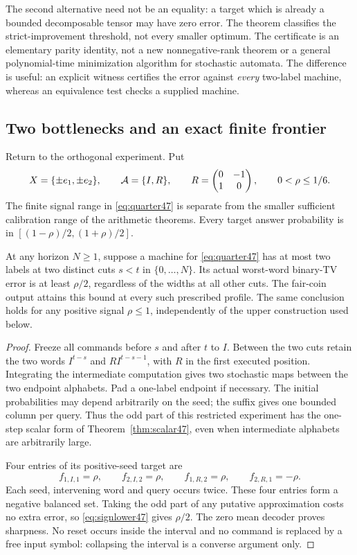The second alternative need not be an equality: a target which is
already a bounded decomposable tensor may have zero error. The theorem
classifies the strict-improvement threshold, not every smaller optimum.
The certificate is an elementary parity identity, not a new
nonnegative-rank theorem or a general polynomial-time minimization
algorithm for stochastic automata. The difference is useful: an
explicit witness certifies the error against \emph{every} two-label
machine, whereas an equivalence test checks a supplied machine.

\subsection{Two bottlenecks and an exact finite frontier}
Return to the orthogonal experiment. Put
\begin{equation}\label{eq:quarter47}
 X=\{\pm e_1,\pm e_2\},\qquad
 \mathcal A=\{I,R\},\qquad
 R=\begin{pmatrix}0&-1\\1&0\end{pmatrix},
 \qquad0<\rho\le1/6.
\end{equation}
The finite signal range in \eqref{eq:quarter47} is separate from the
smaller sufficient calibration range of the arithmetic theorems.
Every target answer probability is in $[(1-\rho)/2,(1+\rho)/2]$.

\begin{theorem}\label{thm:bottleneck47}
At any horizon $N\ge1$, suppose a machine for \eqref{eq:quarter47}
has at most two labels at two distinct cuts $s<t$ in $\{0,\ldots,N\}$.
Its actual worst-word binary-TV error is at least $\rho/2$, regardless
of the widths at all other cuts. The fair-coin output attains this
bound at every such prescribed profile. The same conclusion holds
for any positive signal $\rho\le1$, independently of the upper
construction used below.
\end{theorem}
\begin{proof}
Freeze all commands before $s$ and after $t$ to $I$. Between the two
cuts retain the two words $I^{t-s}$ and $RI^{t-s-1}$, with $R$ in
the first executed position. Integrating the intermediate computation
gives two stochastic maps between the two endpoint alphabets. Pad a
one-label endpoint if necessary. The initial probabilities may depend
arbitrarily on the seed; the suffix gives one bounded column per query.
Thus the odd part of this restricted experiment has the one-step
scalar form of Theorem~\ref{thm:scalar47}, even when intermediate
alphabets are arbitrarily large.

Four entries of its positive-seed target are
\[
 f_{1,I,1}=\rho,\qquad f_{2,I,2}=\rho,\qquad
 f_{1,R,2}=\rho,\qquad f_{2,R,1}=-\rho.
\]
Each seed, intervening word and query occurs twice. These four entries
form a negative balanced set. Taking the odd part of any putative
approximation costs no extra error, so \eqref{eq:signlower47} gives
$\rho/2$. The zero mean decoder proves sharpness. No reset occurs
inside the interval and no command is replaced by a free input symbol:
collapsing the interval is a converse argument only.
\end{proof}

